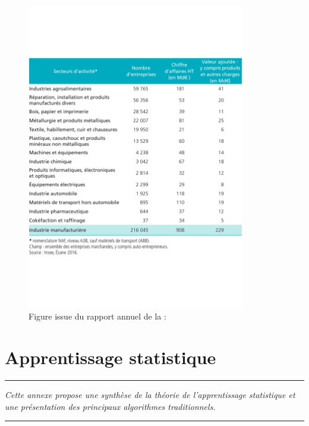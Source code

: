 \begin{figure}[hbt]
	\centering
	\includegraphics[width=0.85\textwidth,height=\textheight,keepaspectratio]{../Chap1/Figures/2018-Chiffres-cles-industrie-manufacturiere-secteur.pdf}
	\caption{Figure issue du rapport annuel de la \citeauthor{directiongeneraledesentreprises_chiffres_2019} :   \cite{directiongeneraledesentreprises_chiffres_2019}}
	\label{fig:molding_economy}
\end{figure}


\FloatBarrier
\chapter{Apprentissage statistique}
\label{Ann:3}


\begin{center}
	\rule{0.7\linewidth}{.5pt}
	\begin{minipage}{0.7\linewidth}
		\smallskip
		
		\textit{
			Cette annexe propose une synthèse de la théorie de l'apprentissage statistique et une présentation des principaux algorithmes traditionnels.
		}
		
	\end{minipage}
	\smallskip
	\rule{0.7\linewidth}{.5pt}
\end{center}

